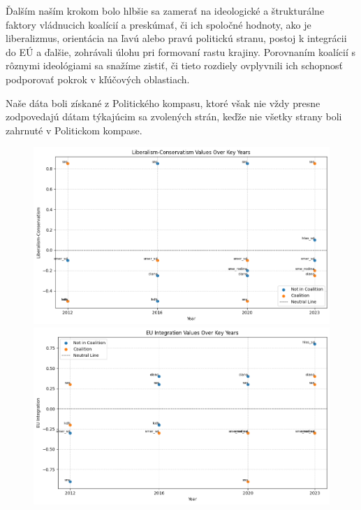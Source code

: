 \documentclass[report.tex]{subfiles}
\begin{document}
\newpage

Ďalším naším krokom bolo hlbšie sa zamerať na ideologické a štrukturálne faktory vládnucich koalícií a preskúmať, či ich spoločné hodnoty, ako je liberalizmus, orientácia na ľavú alebo pravú politickú stranu, postoj k integrácii do EÚ a ďalšie, zohrávali úlohu pri formovaní rastu krajiny. Porovnaním koalícií s rôznymi ideológiami sa snažíme zistiť, či tieto rozdiely ovplyvnili ich schopnosť podporovať pokrok v kľúčových oblastiach. 

Naše dáta boli získané z Politického kompasu, ktoré však nie vždy presne zodpovedajú dátam týkajúcim sa zvolených strán, keďže nie všetky strany boli zahrnuté v Politickom kompase.


\begin{figure}[!htbp]
    \centering
    \includegraphics[width=\textwidth]
    {images_exploratory/Liberalism-Conservatism.png}
    \caption{}

    \centering
    \includegraphics[width=\textwidth]
    {images_exploratory/EU-Intergration.png}
    \caption{}
\end{figure}
\end{document}
